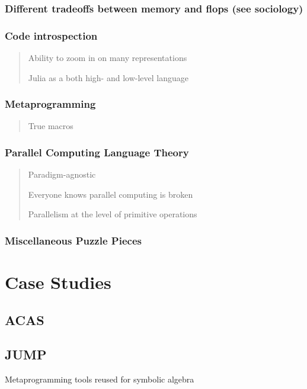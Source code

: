 \documentclass[12pt]{mitthesis}
\begin{document}
\section{Different tradeoffs between memory and flops (see sociology)}


\section{Code introspection}
\begin{quotation}
Ability to zoom in on many representations

Julia as a both high- and low-level language
\end{quotation}

\section{Metaprogramming}
\begin{quotation}
True macros
\end{quotation}

\section{Parallel Computing Language Theory}
\begin{quotation}
Paradigm-agnostic

Everyone knows parallel computing is broken

Parallelism at the level of primitive operations
\end{quotation}

\section{Miscellaneous Puzzle Pieces}


\part{Case Studies}


\chapter{ACAS}


\chapter{JUMP}

Metaprogramming tools reused for symbolic algebra
\end{document}

